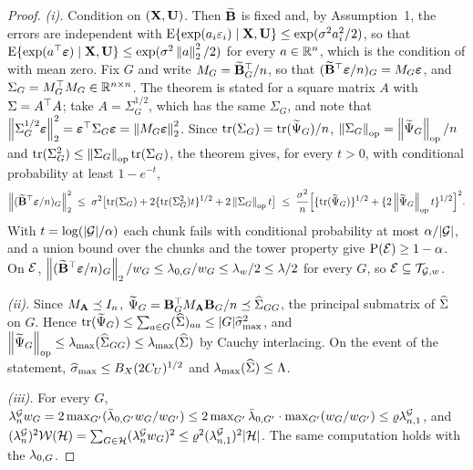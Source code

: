 \begin{proof}
\emph{(i).} Condition on $(\mathbf{X},\mathbf{U})$. Then $\widetilde{\mathbf{B}}$ is fixed and, by
Assumption~1, the errors are independent with
$\mathrm{E}\{\exp(a_{i}\varepsilon_{i})\mid\mathbf{X},\mathbf{U}\} \le \exp(\sigma^{2}a_{i}^{2}/2)$,
so that $\mathrm{E}\{\exp(a^{\top}\boldsymbol{\varepsilon})\mid\mathbf{X},\mathbf{U}\} \le \exp(\sigma^{2}\left\lVert a \right\rVert_{2}^{2}/2)$
for every $a \in \mathbb{R}^{n}$, which is the condition of
\citet[Theorem~2.1]{Hsu-Kakade-Zhang-2012} with mean zero. Fix $G$ and write
$M_{G} = \widetilde{\mathbf{B}}_{G}^{\top}/n$, so that $(\widetilde{\mathbf{B}}^{\top}\boldsymbol{\varepsilon}/n)_{G} = M_{G}\boldsymbol{\varepsilon}$, and
$\Sigma_{G} = M_{G}^{\top} M_{G} \in \mathbb{R}^{n\times n}$. The theorem is stated for a
square matrix $A$ with $\Sigma = A^{\top} A$; take $A = \Sigma_{G}^{1/2}$, which has
the same $\Sigma_{G}$, and note that
$\left\lVert \Sigma_{G}^{1/2}\boldsymbol{\varepsilon} \right\rVert_{2}^{2} = \boldsymbol{\varepsilon}^{\top}\Sigma_{G}\boldsymbol{\varepsilon} =
\left\lVert M_{G}\boldsymbol{\varepsilon} \right\rVert_{2}^{2}$. Since $\mathrm{tr}(\Sigma_{G}) =
\mathrm{tr}(\widetilde{\Psi}_{G})/n$, $\left\lVert \Sigma_{G} \right\rVert_{\mathrm{op}} = \left\lVert \widetilde{\Psi}_{G} \right\rVert_{\mathrm{op}}/n$
and $\mathrm{tr}(\Sigma_{G}^{2}) \le \left\lVert \Sigma_{G} \right\rVert_{\mathrm{op}}\mathrm{tr}(\Sigma_{G})$,
the theorem gives, for every $t > 0$, with conditional probability at least
$1 - e^{-t}$,
\[
  \left\lVert (\widetilde{\mathbf{B}}^{\top}\boldsymbol{\varepsilon}/n)_{G} \right\rVert_{2}^{2}
  \;\le\; \sigma^{2}\bigl[\mathrm{tr}(\Sigma_{G})
  + 2\{\mathrm{tr}(\Sigma_{G}^{2})t\}^{1/2} + 2\left\lVert \Sigma_{G} \right\rVert_{\mathrm{op}}t\bigr]
  \;\le\; \frac{\sigma^{2}}{n}\Bigl[\{\mathrm{tr}(\widetilde{\Psi}_{G})\}^{1/2}
  + \{2\left\lVert \widetilde{\Psi}_{G} \right\rVert_{\mathrm{op}}t\}^{1/2}\Bigr]^{2}.
\]
With $t = \log(|\mathcal{G}|/\alpha)$ each chunk fails with conditional probability
at most $\alpha/|\mathcal{G}|$, and a union bound over the chunks and the tower
property give $\mathrm{P}(\mathcal{E}) \ge 1-\alpha$. On $\mathcal{E}$,
$\left\lVert (\widetilde{\mathbf{B}}^{\top}\boldsymbol{\varepsilon}/n)_{G} \right\rVert_{2}/w_{G} \le \lambda_{0,G}/w_{G} \le \lambda_{w}/2 \le
\lambda/2$ for every $G$, so $\mathcal{E} \subseteq \mathcal{T}_{\mathcal{G},w}$.

\emph{(ii).} Since $M_{\mathbf{A}} \preceq I_{n}$,
$\widetilde{\Psi}_{G} = \mathbf{B}_{G}^{\top}M_{\mathbf{A}}\mathbf{B}_{G}/n \preceq \widehat{\Sigma}_{GG}$, the principal
submatrix of $\widehat{\Sigma}$ on $G$. Hence $\mathrm{tr}(\widetilde{\Psi}_{G}) \le
\sum_{a\in G}(\widehat{\Sigma})_{aa} \le |G|\widehat{\sigma}_{\max}^{2}$, and
$\left\lVert \widetilde{\Psi}_{G} \right\rVert_{\mathrm{op}} \le \lambda_{\max}(\widehat{\Sigma}_{GG}) \le \lambda_{\max}(\widehat{\Sigma})$ by Cauchy
interlacing. On the event of the statement,
$\widehat{\sigma}_{\max} \le B_X(2C_U)^{1/2}$ and $\lambda_{\max}(\widehat{\Sigma}) \le \Lambda$.

\emph{(iii).} For every $G$,
$\lambda^{\mathcal{G}}_{n} w_{G} = 2\max_{G'}(\bar{\lambda}_{0,G'}w_{G}/w_{G'}) \le
2\max_{G'}\bar{\lambda}_{0,G'}\cdot\max_{G'}(w_{G}/w_{G'}) \le \varrho\lambda^{\mathcal{G}}_{n,1}$, and
$(\lambda^{\mathcal{G}}_{n})^{2}\mathcal{W}(\mathcal{H}) = \sum_{G\in\mathcal{H}}(\lambda^{\mathcal{G}}_{n} w_{G})^{2} \le
\varrho^{2}(\lambda^{\mathcal{G}}_{n,1})^{2}|\mathcal{H}|$. The same computation holds with the
$\lambda_{0,G}$.
\end{proof}


